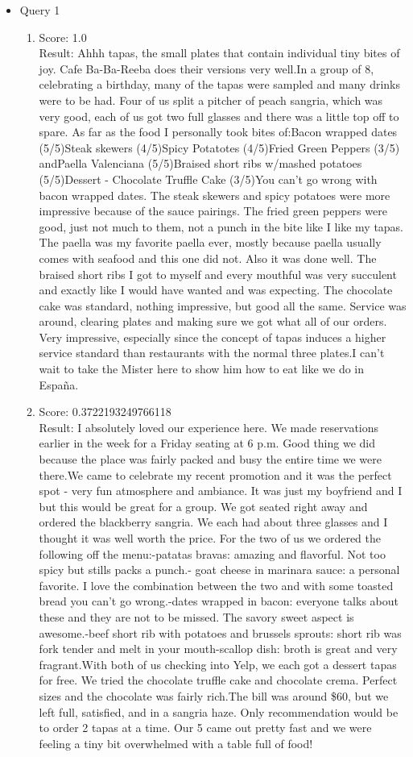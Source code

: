 \documentclass[paper=a4, fontsize=11pt]{jhwhw} %
\begin{document}
\begin{itemize}
\item Query 1
\begin{enumerate}
\item Score: 1.0\\
Result: Ahhh tapas, the small plates that contain individual tiny bites of joy. Cafe Ba-Ba-Reeba does their versions very well.In a group of 8, celebrating a birthday, many of the tapas were sampled and many drinks were to be had. Four of us split a pitcher of peach sangria, which was very good, each of us got two full glasses and there was a little top off to spare. As far as the food I personally took bites of:Bacon wrapped dates (5/5)Steak skewers (4/5)Spicy Potatotes (4/5)Fried Green Peppers (3/5) andPaella Valenciana (5/5)Braised short ribs w/mashed potatoes (5/5)Dessert - Chocolate Truffle Cake (3/5)You can't go wrong with bacon wrapped dates. The steak skewers and spicy potatoes were more impressive because of the sauce pairings. The fried green peppers were good, just not much to them, not a punch in the bite like I like my tapas. The paella was my favorite paella ever, mostly because paella usually comes with seafood and this one did not. Also it was done well. The braised short ribs I got to myself and every mouthful was very succulent and exactly like I would have wanted and was expecting. The chocolate cake was standard, nothing impressive, but good all the same. Service was around, clearing plates and making sure we got what all of our orders. Very impressive, especially since the concept of tapas induces a higher service standard than restaurants with the normal three plates.I can't wait to take the Mister here to show him how to eat like we do in España.
\item Score: 0.3722193249766118\\
Result: I absolutely loved our experience here. We made reservations earlier in the week for a Friday seating at 6 p.m. Good thing we did because the place was fairly packed and busy the entire time we were there.We came to celebrate my recent promotion and it was the perfect spot - very fun atmosphere and ambiance. It was just my boyfriend and I but this would be great for a group. We got seated right away and ordered the blackberry sangria. We each had about three glasses and I thought it was well worth the price. For the two of us we ordered the following off the menu:-patatas bravas: amazing and flavorful. Not too spicy but stills packs a punch.- goat cheese in marinara sauce: a personal favorite. I love the combination between the two and with some toasted bread you can't go wrong.-dates wrapped in bacon: everyone talks about these and they are not to be missed. The savory sweet aspect is awesome.-beef short rib with potatoes and brussels sprouts: short rib was fork tender and melt in your mouth-scallop dish: broth is great and very fragrant.With both of us checking into Yelp, we each got a dessert tapas for free. We tried the chocolate truffle cake and chocolate crema. Perfect sizes and the chocolate was fairly rich.The bill was around \$60, but we left full, satisfied, and in a sangria haze. Only recommendation would be to order 2 tapas at a time. Our 5 came out pretty fast and we were feeling a tiny bit overwhelmed with a table full of food!

\end{enumerate}
\end{itemize}
\end{document}
